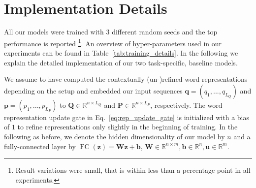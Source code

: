\documentclass[11pt,a4paper]{article}
\begin{document}




%
%



\clearpage
\clearpage

\appendix

\section{Implementation Details}\label{sec:impl}

All our models were trained with 3 different random seeds and the top performance is reported \footnote{Result variations were small, that is within less than a percentage point in all experiments.}. An overview of hyper-parameters used in our experiments can be found in Table~\ref{tab:training_details}. In the following we explain the detailed implementation of our two task-specific, baseline models. 

We assume to have computed the contextually (un-)refined word representations depending on the setup and embedded our input sequences $\boldsymbol{q}=(q_1,...,q_{L_Q})$ and  $\boldsymbol{p}=(p_1,...,p_{L_P})$ to $\mathbf{Q} \in \mathbb{R}^{n \times L_Q}$ and $\mathbf{P} \in \mathbb{R}^{n \times L_P}$, respectively. The word representation update gate in Eq.~\ref{eq:rep_update_gate} is initialized with a bias of $1$ to refine representations only slightly in the beginning of training. In the following as before, we denote the hidden dimensionality of our model by $n$ and a fully-connected layer by $\operatorname{FC}(\mathbf{z})=\mathbf{Wz}+\mathbf{b}$, $\mathbf{W}\in \mathbb{R}^{n \times m}, \mathbf{b}\in\mathbb{R}^n, \mathbf{u}\in\mathbb{R}^m$.
\end{document}
